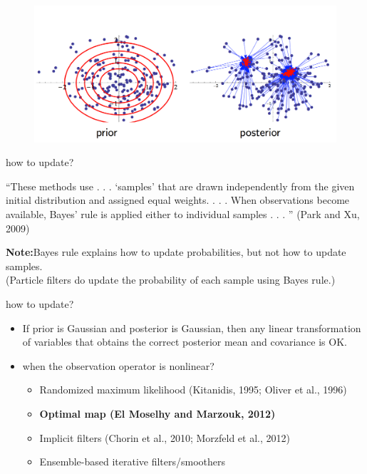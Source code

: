 \documentclass[table]{beamer}
\begin{document}
\begin{CJK}{UTF8}{gbsn}
\begin{frame}
\begin{figure}
\includegraphics[scale=0.2]{img/pirorposterior3.png}
\end{figure}

\end{frame}

\begin{frame}
how to update?

\hfill

“These methods use . . . ‘samples’ that are drawn independently from the given initial distribution and assigned equal weights.
. . . When observations become available, Bayes’ rule is applied either to individual samples . . . ” (Park and Xu, 2009)

\hfill

\textbf{Note:}Bayes rule explains how to update probabilities, but not how to update samples.\\
(Particle filters do update the probability of each sample using Bayes rule.)
\end{frame}

\begin{frame}
how to update?

\hfill
\begin{itemize}
\item If prior is Gaussian and posterior is Gaussian, then any linear transformation of variables that obtains the correct posterior mean and covariance is OK.
\item when the observation operator is nonlinear?
\begin{itemize}
\item Randomized maximum likelihood (Kitanidis, 1995; Oliver et al., 1996)
\item  \textbf {Optimal map (El Moselhy and Marzouk, 2012)}
\item Implicit filters (Chorin et al., 2010; Morzfeld et al., 2012)
\item Ensemble-based iterative filters/smoothers
\end{itemize}
\end{itemize}


\end{frame}
\end{CJK}
\end{document}
